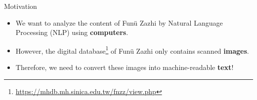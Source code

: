 \documentclass{beamer}
\begin{document}
\begin{frame}
    \begin{center}
        \Large{Motivation}
    \end{center}
    \begin{itemize}
        \item We want to analyze the content of Funü Zazhi by Natural Language Processing (NLP) using \textbf{computers}.
        \item However, the digital database\footnote{\url{https://mhdb.mh.sinica.edu.tw/fnzz/view.php}} of Funü Zazhi only contains scanned \textbf{images}.
        \item Therefore, we need to convert these images into machine-readable \textbf{text}!
    \end{itemize}
\end{frame}
\end{document}
